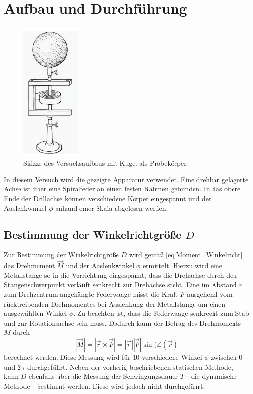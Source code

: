 \section{Aufbau und Durchführung} %
\label{sec:durchfhrung}
\begin{figure}[h]
	\label{fig:drillachse}
	\centering
	\includegraphics[height=7cm]{Bilder/drillachse}
	\caption{Skizze des Versuchsaufbaus mit Kugel als Probekörper}
\end{figure}
In diesem Versuch wird die gezeigte Apparatur verwendet. 
Eine drehbar gelagerte Achse ist über eine Spiralfeder an einen festen Rahmen gebunden. 
In das obere Ende der Drillachse können verschiedene Körper eingespannt und der Auslenkwinkel $\phi$ anhand einer Skala abgelesen werden.
\subsection{Bestimmung der Winkelrichtgröße $D$}
\label{subsec:winkelricht}
Zur Bestimmung der Winkelrichtgröße $D$ wird gemäß \eqref{eq:Moment_Winkelricht} das Drehmoment $\vec{M}$ und der Auslenkwinkel $\phi$ ermittelt. Hierzu wird eine Metallstange so in die Vorrichtung eingespannt, 
dass die Drehachse durch den Stangenschwerpunkt verläuft senkrecht zur Drehachse steht.
Eine im Abstand $r$ zum Drehzentrum angehängte Federwaage misst die Kraft $F$ ausgehend vom rücktreibenden Drehmomentes bei Auslenkung der Metallstange um einen ausgewählten Winkel $\phi$. 
Zu beachten ist, dass die Federwaage senkrecht zum Stab und zur Rotationsachse sein muss. 
Dadurch kann der Betrag des Drehmoments $M$ durch
\begin{equation}
	| \vec{M} | = | \vec{r} \times \vec{F} | = |\vec{r}| |\vec{F}| \sin (\angle({\vec{r}})
\end{equation}
berechnet werden.
Diese Messung wird für 10 verschiedene Winkel $\phi$ zwischen 0 und $2\mathup{\pi}$ durchgeführt. Neben der vorherig beschriebenen statischen Methode, kann $D$ ebenfalls über die Messung der Schwingungsdauer $T$ - die dynamische Methode - bestimmt werden. Diese wird jedoch nicht durchgeführt.

